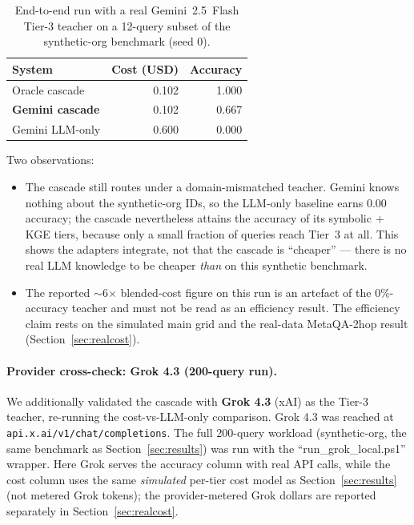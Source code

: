\documentclass[11pt]{article}
\theoremstyle{plain}
\begin{document}
\begin{table}[t]
\centering
\small
\caption{End-to-end run with a real Gemini~2.5~Flash Tier-3 teacher
on a 12-query subset of the synthetic-org
benchmark (seed 0).}
\label{tab:gemini}
\begin{tabular}{lrr}
\toprule
System & Cost (USD) & Accuracy \\
\midrule
Oracle cascade & 0.102 & 1.000 \\
\textbf{Gemini cascade} & 0.102 & 0.667 \\
Gemini LLM-only & 0.600 & 0.000 \\
\bottomrule
\end{tabular}
\end{table}


Two observations:

\begin{itemize}
\item The cascade still routes under a domain-mismatched teacher. Gemini knows
nothing about the synthetic-org IDs, so the LLM-only baseline earns \(0.00\)
accuracy; the cascade nevertheless attains the accuracy of its symbolic + KGE
tiers, because only a small fraction of queries reach Tier~3 at all. This shows
the adapters integrate, not that the cascade is ``cheaper'' --- there is no real
LLM knowledge to be cheaper \emph{than} on this synthetic benchmark.
\item The reported $\sim$6$\times$ blended-cost figure on this run is an
artefact of the $0\%$-accuracy teacher and must not be read as an efficiency
result. The efficiency claim rests on the simulated main grid and the real-data
MetaQA-2hop result (Section~\ref{sec:realcost}).
\end{itemize}

\paragraph{Provider cross-check: Grok 4.3 (200-query run).}
We additionally validated the cascade with \textbf{Grok 4.3} (xAI)
as the Tier-3 teacher, re-running the cost-vs-LLM-only comparison.
Grok 4.3 was reached at
\texttt{api.x.ai/v1/chat/completions}.  The full
200-query workload (synthetic-org, the same benchmark as
Section~\ref{sec:results}) was run with the
``run\_grok\_local.ps1'' wrapper. Here Grok serves the accuracy column with
real API calls, while the cost column uses the same \emph{simulated} per-tier
cost model as Section~\ref{sec:results} (not metered Grok tokens); the
provider-metered Grok dollars are reported separately in
Section~\ref{sec:realcost}.
\end{document}
